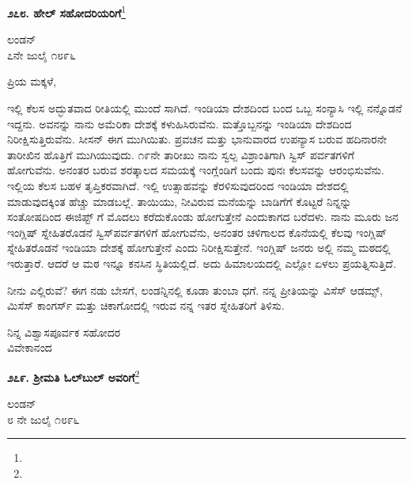 \newpage

\begin{center}
\textbf{೨೭೮. ಹೇಲ್ ಸಹೋದರಿಯರಿಗೆ}\footnote{}
\end{center}

\vspace{-0.5cm}

\begin{flushright}
ಲಂಡನ್\\೭ನೇ ಜುಲೈ ೧೮೯೬
\end{flushright}

\vspace{-0.5cm}

\noindent
ಪ್ರಿಯ ಮಕ್ಕಳೆ,

ಇಲ್ಲಿ ಕೆಲಸ ಅದ್ಭುತವಾದ ರೀತಿಯಲ್ಲಿ ಮುಂದೆ ಸಾಗಿದೆ. ಇಂಡಿಯಾ ದೇಶದಿಂದ ಬಂದ ಒಬ್ಬ ಸಂನ್ಯಾಸಿ ಇಲ್ಲಿ ನನ್ನೊಡನೆ ಇದ್ದನು. ಅವನನ್ನು ನಾನು ಅಮೆರಿಕಾ ದೇಶಕ್ಕೆ ಕಳುಹಿಸಿರುವೆನು. ಮತ್ತೊಬ್ಬನನ್ನು ಇಂಡಿಯಾ ದೇಶದಿಂದ ನಿರೀಕ್ಷಿಸುತ್ತಿರುವೆನು. ಸೀಸನ್ ಈಗ ಮುಗಿಯಿತು. ಪ್ರವಚನ ಮತ್ತು ಭಾನುವಾರದ ಉಪನ್ಯಾಸ ಬರುವ ಹದಿನಾರನೇ ತಾರೀಖಿನ ಹೊತ್ತಿಗೆ ಮುಗಿಯುವುದು. ೧೯ನೇ ತಾರೀಖು ನಾನು ಸ್ವಲ್ಪ ವಿಶ್ರಾಂತಿಗಾಗಿ ಸ್ವಿಸ್ ಪರ್ವತಗಳಿಗೆ ಹೋಗುವೆನು. ಅನಂತರ ಬರುವ ಶರತ್ಕಾಲದ ಸಮಯಕ್ಕೆ ಇಂಗ್ಲೆಂಡಿಗೆ ಬಂದು ಪುನಃ ಕೆಲಸವನ್ನು ಆರಂಭಿಸುವೆನು. ಇಲ್ಲಿಯ ಕೆಲಸ ಬಹಳ ತೃಪ್ತಿಕರವಾಗಿದೆ. ಇಲ್ಲಿ ಉತ್ಸಾಹವನ್ನು ಕೆರಳಿಸುವುದರಿಂದ ಇಂಡಿಯಾ ದೇಶದಲ್ಲಿ ಮಾಡುವುದಕ್ಕಿಂತ ಹೆಚ್ಚು ಮಾಡಬಲ್ಲೆ. ತಾಯಿಯು, ನೀವಿರುವ ಮನೆಯನ್ನು ಬಾಡಿಗೆಗೆ ಕೊಟ್ಟರೆ ನಿನ್ನನ್ನು ಸಂತೋಷದಿಂದ ಈಜಿಪ್ಟ್ ಗೆ ಮೊದಲು ಕರೆದುಕೊಂಡು ಹೋಗುತ್ತೇನೆ ಎಂದುಕಾಗದ ಬರೆದಳು. ನಾನು ಮೂರು ಜನ ಇಂಗ್ಲಿಷ್ ಸ್ನೇಹಿತರೊಡನೆ ಸ್ವಿಸ್‌ಪರ್ವತಗಳಿಗೆ ಹೋಗುವೆನು, ಅನಂತರ ಚಳಿಗಾಲದ ಕೊನೆಯಲ್ಲಿ ಕೆಲವು ಇಂಗ್ಲಿಷ್ ಸ್ನೇಹಿತರೊಡನೆ ಇಂಡಿಯಾ ದೇಶಕ್ಕೆ ಹೋಗುತ್ತೇನೆ ಎಂದು ನಿರೀಕ್ಷಿಸುತ್ತೇನೆ. ಇಂಗ್ಲಿಷ್ ಜನರು ಅಲ್ಲಿ ನಮ್ಮ ಮಠದಲ್ಲಿ ಇರುತ್ತಾರೆ. ಆದರೆ ಆ ಮಠ ಇನ್ನೂ ಕನಸಿನ ಸ್ಥಿತಿಯಲ್ಲಿದೆ. ಅದು ಹಿಮಾಲಯದಲ್ಲಿ ಎಲ್ಲೋ ಏಳಲು ಪ್ರಯತ್ನಿಸುತ್ತಿದೆ.

ನೀನು ಎಲ್ಲಿರುವೆ? ಈಗ ನಡು ಬೇಸಗೆ, ಲಂಡನ್ನಿನಲ್ಲಿ ಕೂಡಾ ತುಂಬಾ ಧಗೆ. ನನ್ನ ಪ್ರೀತಿಯನ್ನು ವಿಸೆಸ್ ಆಡಮ್ಸ್, ಮಿಸೆಸ್ ಕಾಂಗರ್ಸ್ ಮತ್ತು ಚಿಕಾಗೋದಲ್ಲಿ ಇರುವ ನನ್ನ ಇತರ ಸ್ನೇಹಿತರಿಗೆ ತಿಳಿಸು.

\vspace{-0.5cm}

{\flushright
ನಿನ್ನ ವಿಶ್ವಾಸಪೂರ್ವಕ ಸಹೋದರ\\ವಿವೇಕಾನಂದ\par}
\vspace{-0.5cm}

\begin{center}
\textbf{೨೭೯. ಶ‍್ರೀಮತಿ ಓಲ್‌ಬುಲ್‌ ಅವರಿಗೆ}\footnote{}
\end{center}
\vspace{-0.5cm}

\begin{flushright}
ಲಂಡನ್\\೮ ನೇ ಜುಲೈ ೧೮೯೬
\end{flushright}
\vspace{-0.5cm}

